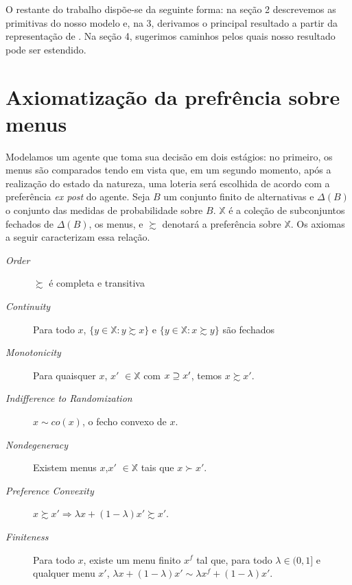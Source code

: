\documentclass[11pt, a4paper]{article}
\theoremstyle{nonumberplain}
\theoremstyle{plain}
\theoremstyle{plain}
\theoremstyle{plain}
\begin{document}
O restante do trabalho dispõe-se da seguinte forma: na seção 2 descrevemos as primitivas do nosso modelo e, na 3, derivamos o principal resultado a partir da representação de \cite{Kochov2007}. Na seção 4, sugerimos caminhos pelos quais nosso resultado pode ser estendido. 

\section{Axiomatização da prefrência sobre menus}
Modelamos um agente que toma sua decisão em dois estágios: no primeiro, os menus são comparados tendo em vista que, em um segundo momento, após a realização do estado da natureza, uma loteria será escolhida de acordo com a preferência \emph{ex post} do agente.  
Seja $B$ um conjunto finito de alternativas e $\Delta(B)$ o conjunto das medidas de probabilidade sobre $B$. $\mathbb{X}$ é a coleção de subconjuntos fechados de $\Delta(B)$, os menus, e $\succsim$ denotará a preferência sobre $\mathbb{X}$. Os axiomas a seguir caracterizam essa relação.
\begin{description}
\item [\textit{Order}] $\succsim$ é completa e transitiva  
\item [\textit{Continuity}] Para todo $x$, $\{y\in \mathbb{X}:y\succsim x\}$ e $\{y\in \mathbb{X}:x\succsim y\}$ são fechados%
\item [\textit{Monotonicity}] Para quaisquer $x$, $x'$ $\in\mathbb{X}$ com $x\begin{small}\supseteq\end{small} x'$, temos $x\succsim x'$. 
\item [\textit{Indifference to Randomization}] $x\sim co(x)$, o fecho convexo de $x$. 
\item [\textit{Nondegeneracy}] Existem menus $x$,$x'$ $\in \mathbb{X}$ tais que $x\succ x'$.
\item [\textit{Preference Convexity}] $x\succsim x' \Rightarrow \lambda x +(1-\lambda)x'\succsim x'$.
\item[\textit{Finiteness}] Para todo $x$, existe um menu finito $x^f$ tal que, para todo $\lambda\in (0,1]$ e qualquer menu $x'$, $\lambda x +(1-\lambda)x' \sim \lambda x^f +(1-\lambda)x'$.
\end{description}  
\end{document}
